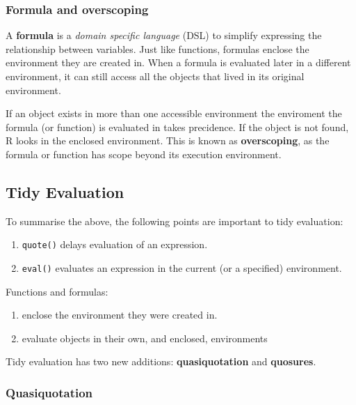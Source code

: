 \documentclass[]{book}
\providecommand{\tightlist}{%
  \setlength{\itemsep}{0pt}\setlength{\parskip}{0pt}}
\begin{document}
\hypertarget{formula-and-overscoping}{%
\subsubsection{Formula and overscoping}\label{formula-and-overscoping}}

A \textbf{formula} is a \emph{domain specific language} (DSL) to simplify expressing the relationship
between variables. Just like functions, formulas enclose the environment they are created
in. When a formula is evaluated later in a different environment, it can still access all
the objects that lived in its original environment.

If an object exists in more than one accessible environment the enviroment the formula
(or function) is evaluated in takes precidence. If the object is not found, R looks
in the enclosed environment. This is known as \textbf{overscoping}, as the formula or
function has scope beyond its execution environment.

\hypertarget{tidy-evaluation}{%
\subsection{Tidy Evaluation}\label{tidy-evaluation}}

To summarise the above, the following points are important to tidy evaluation:

\begin{enumerate}
\def\labelenumi{\arabic{enumi}.}
\tightlist
\item
  \texttt{quote()} delays evaluation of an expression.
\item
  \texttt{eval()} evaluates an expression in the current (or a specified) environment.
\end{enumerate}

Functions and formulas:

\begin{enumerate}
\def\labelenumi{\arabic{enumi}.}
\setcounter{enumi}{2}
\tightlist
\item
  enclose the environment they were created in.
\item
  evaluate objects in their own, and enclosed, environments
\end{enumerate}

Tidy evaluation has two new additions: \textbf{quasiquotation} and \textbf{quosures}.

\hypertarget{quasiquotation}{%
\subsubsection{Quasiquotation}\label{quasiquotation}}
\end{document}
